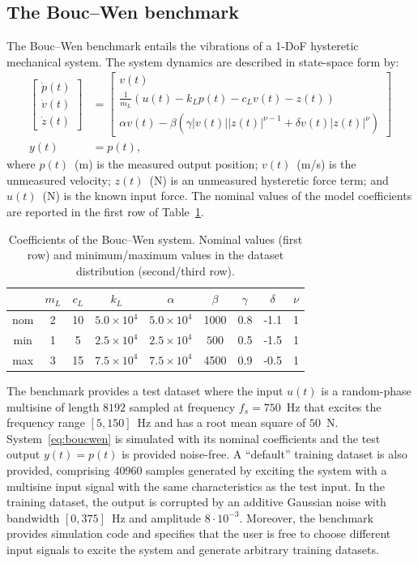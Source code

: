 \documentclass{article}
\begin{document}
\subsection{The Bouc--Wen benchmark}
The Bouc--Wen benchmark entails the vibrations of a 1-DoF hysteretic mechanical system. The system dynamics are described in state-space form by:
\begin{subequations}
\label{eq:boucwen}
\begin{align}
\begin{bmatrix}
\dot{p}(t) \\
\dot{v}(t) \\
\dot{z}(t)
\end{bmatrix}
&=
\begin{bmatrix}
v(t) \\
\frac{1}{m_L} \left (u(t) -k_L p(t) - c_L v(t) - z(t)  \right) \\
\alpha v(t) - \beta(\gamma |v(t)| |z(t)|^{\nu -1} + \delta v(t) |z(t)|^\nu)
\end{bmatrix}\\
y(t) &= p(t),
\end{align}
\end{subequations}
where $p(t)$~(m) is the measured output position; $v(t)$~(m/s) is the unmeasured velocity; $z(t)$~(N) is an unmeasured hysteretic force term; and $u(t)$~(N) is the known input force. The nominal values of the model coefficients are reported in the first row of Table~\ref{tab:bw_params}.
\begin{table}[!ht]
\setlength{\tabcolsep}{4pt}
\centering
\caption{Coefficients of the Bouc--Wen system. Nominal values (first row) and minimum/maximum values in the dataset distribution (second/third row).}
\label{tab:bw_params}
\small
\begin{tabular}{c||cccccccc}
\toprule
 & $m_L$ & $c_L$ & $k_L$ & $\alpha$ & $\beta$ & $\gamma$ & $\delta$ &$\nu$\\
\midrule
nom & 2 & 10 &$5.0\times 10^4$ & $5.0\times 10^4$ & 1000 & 0.8 & -1.1 & 1\\
min & 1 & 5 & $2.5\times 10^4$ & $2.5\times 10^4$ & $500$ & 0.5 & -1.5 &1\\
max & 3 & 15 & $7.5\times 10^4$ & $7.5\times 10^4$ & 4500 & 0.9 & -0.5 &1\\
\bottomrule
\end{tabular}
\end{table}

The benchmark provides a test dataset where the input $u(t)$ is a random-phase multisine of length $8192$ sampled at frequency $f_s=750$~Hz  that excites the frequency range $[5, 150]$~Hz and has a root mean square of $50$~N. System~\eqref{eq:boucwen} is simulated with
its nominal coefficients and the test output $y(t) = p(t)$ is provided noise-free.
A ``default'' training dataset is also provided,  comprising 40960 samples generated by exciting the system with a multisine input signal with the same characteristics as the test input. In the training dataset, the output is corrupted by an additive Gaussian noise with bandwidth $[0, 375]$~Hz and amplitude $8 \cdot 10^{-3}$. Moreover, the benchmark provides simulation code and specifies that the user is free to choose different input signals to excite the system and generate arbitrary training datasets.
\end{document}
